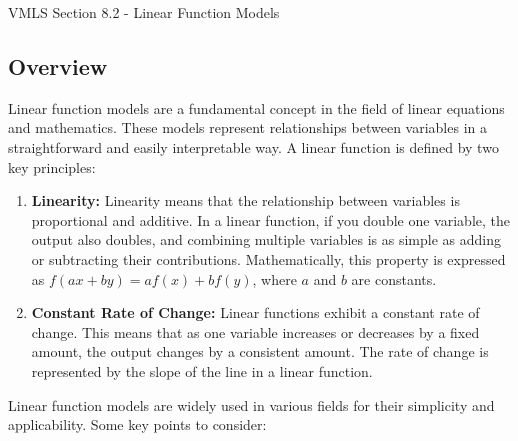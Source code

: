 \begin{notes}{VMLS Section 8.2 - Linear Function Models}
    \subsection*{Overview}

    Linear function models are a fundamental concept in the field of linear equations and mathematics. These models represent relationships between variables in a straightforward and easily interpretable 
    way. A linear function is defined by two key principles:

    \begin{enumerate}
        \item \textbf{Linearity:} Linearity means that the relationship between variables is proportional and additive. In a linear function, if you double one variable, the output also doubles, and 
        combining multiple variables is as simple as adding or subtracting their contributions. Mathematically, this property is expressed as $f(ax + by) = af(x) + bf(y)$, where $a$ and $b$ are constants.
        \item \textbf{Constant Rate of Change:} Linear functions exhibit a constant rate of change. This means that as one variable increases or decreases by a fixed amount, the output changes by a 
        consistent amount. The rate of change is represented by the slope of the line in a linear function.
    \end{enumerate}
    
    Linear function models are widely used in various fields for their simplicity and applicability. Some key points to consider:


\end{notes}
